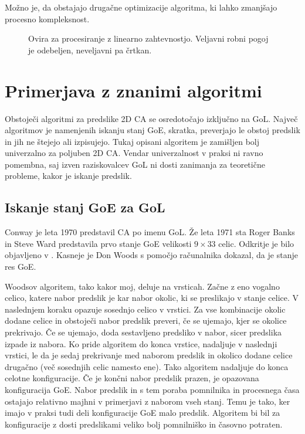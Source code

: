 \documentclass[12pt,a4paper,openany,twoside]{book}
\begin{document}
Možno je, da obstajajo drugačne optimizacije algoritma, ki lahko zmanjšajo procesno kompleksnost.

\begin{figure}[htb]
\centerline{}
\caption[Ovira za procesiranje z linearno zahtevnostjo.]
{Ovira za procesiranje z linearno zahtevnostjo.
Veljavni robni pogoj je odebeljen, neveljavni pa črtkan.}
\label{algorithm_issue}
\end{figure}

\chapter{Primerjava z znanimi algoritmi}

Obstoječi algoritmi za predslike 2D CA se osredotočajo izključno na GoL.
Največ algoritmov je namenjenih iskanju stanj GoE, skratka, preverjajo le
obstoj predslik in jih ne štejejo ali izpisujejo. Tukaj opisani algoritem
je zamišljen bolj univerzalno za poljuben 2D CA. Vendar univerzalnost v
praksi ni ravno pomembna, saj izven raziskovalcev GoL ni dosti zanimanja
za teoretične probleme, kakor je iskanje predslik.

\section{Iskanje stanj GoE za GoL}

Conway je leta 1970 predstavil CA po imenu GoL. Že leta 1971 sta Roger Banks in Steve Ward
predstavila prvo stanje GoE velikosti \(9 \times 33\) celic.
Odkritje je bilo objavljeno v \cite{Lifeline3}. Kasneje je Don Woods
\cite{Lifeline3, Lifeline4} s pomočjo računalnika dokazal, da je stanje res GoE.

Woodsov algoritem, tako kakor moj, deluje na vrsticah.
Začne z eno vogalno celico, katere nabor predslik je kar nabor okolic,
ki se preslikajo v stanje celice. V naslednjem koraku opazuje sosednjo celico v vrstici.
Za vse kombinacije okolic dodane celice in obstoječi nabor predslik preveri,
če se ujemajo, kjer se okolice prekrivajo. Če se ujemajo, doda sestavljeno predsliko v nabor,
sicer predslika izpade iz nabora. Ko pride algoritem do konca vrstice, nadaljuje v naslednji vrstici,
le da je sedaj prekrivanje med naborom predslik in okolico dodane celice drugačno (več sosednjih celic namesto ene).
Tako algoritem nadaljuje do konca celotne konfiguracije.
Če je končni nabor predslik prazen, je opazovana konfiguracija GoE.
Nabor predslik in s tem poraba pomnilnika in procesnega časa ostajajo
relativno majhni v primerjavi z naborom vseh stanj.
Temu je tako, ker imajo v praksi tudi deli konfiguracije GoE malo predslik.
Algoritem bi bil za konfiguracije z dosti predslikami veliko bolj pomnilniško in časovno potraten.
\end{document}
